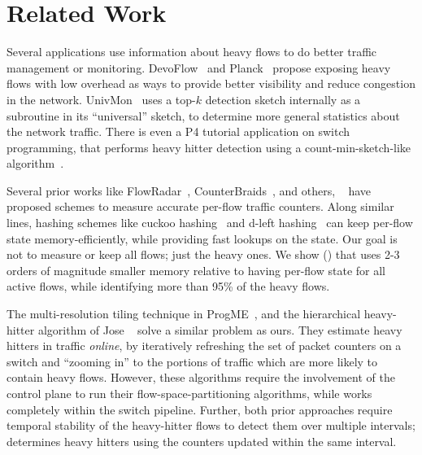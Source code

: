 \section{Related Work}
\label{sec:other-related}

 Several applications
use information about heavy flows to do better traffic
management or monitoring. DevoFlow~\cite{devoflow} and
Planck~\cite{planck} propose exposing heavy flows with low overhead as ways to
provide better visibility and reduce congestion in the
network. UnivMon~\cite{univmon} uses a top-$k$ detection sketch internally as a
subroutine in its ``universal'' sketch, to determine more general statistics
about the network traffic. There is even a P4 tutorial application on switch
programming, that performs heavy hitter detection using a count-min-sketch-like
algorithm~\cite{p4-sigcomm-tutorial-hh-example}.

 Several prior works like
FlowRadar~\cite{li2016flowradar}, CounterBraids~\cite{counterbraids}, and
others, \eg~\cite{li-randomized-counter-sharing} have proposed schemes to
measure accurate per-flow traffic counters. Along similar lines, hashing schemes
like cuckoo hashing~\cite{cuckoo-hashing} and d-left
hashing~\cite{vocking2003asymmetry} can keep per-flow state memory-efficiently,
while providing fast lookups on the state. Our goal is not to measure or keep
all flows; just the heavy ones. We show () that \TheSystem
uses 2-3 orders of magnitude smaller memory relative to having per-flow state
for all active flows, while identifying more than 95\% of the heavy flows.

 The multi-resolution tiling
technique in ProgME~\cite{progme}, and the hierarchical heavy-hitter algorithm
of Jose \etal~\cite{jose2011online} solve a similar problem as
ours. They estimate heavy hitters in traffic {\em online}, by iteratively
refreshing the set of packet counters on a switch and ``zooming in'' to the
portions of traffic which are more likely to contain heavy flows. However, these
algorithms require the involvement of the control plane to run their
flow-space-partitioning algorithms, while \TheSystem works completely within the
switch pipeline. Further, both prior approaches require temporal stability of
the heavy-hitter flows to detect them over multiple intervals; \TheSystem
determines heavy hitters using the counters updated within the same interval.

